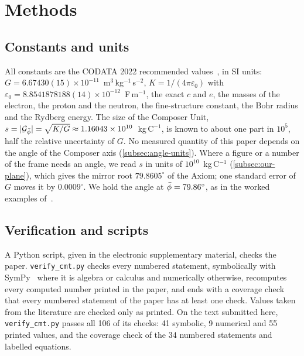 \section{Methods}\label{sec:methods}

\subsection{Constants and units}\label{subsec:constants}

All constants are the CODATA 2022 recommended values~\citep{CODATA2022}, in SI units: $G = 6.67430(15) \times 10^{-11}$~m$^3$\,kg$^{-1}$\,s$^{-2}$, $K = 1/(4\pi\varepsilon_0)$ with $\varepsilon_0 = 8.8541878188(14) \times 10^{-12}$~F\,m$^{-1}$, the exact $c$ and $e$, the masses of the electron, the proton and the neutron, the fine-structure constant, the Bohr radius and the Rydberg energy. The size of the Composer Unit, $s = \lvert\mathcal{G}_{\bar{\phi}}\rvert = \sqrt{K/G} \approx 1.16043 \times 10^{10}$~kg\,C$^{-1}$, is known to about one part in $10^5$, half the relative uncertainty of $G$. No measured quantity of this paper depends on the angle of the Composer axis (\cref{subsec:angle-units}). Where a figure or a number of the frame needs an angle, we read $s$ in units of $10^{10}$~kg\,C$^{-1}$ (\cref{subsec:our-plane}), which gives the mirror root $79.8605^\circ$ of the Axiom; one standard error of $G$ moves it by $0.0009^\circ$. We hold the angle at $\bar{\phi} = 79.86^\circ$, as in the worked examples of~\citep{DerrazGN2026}.

\subsection{Verification and scripts}\label{subsec:scripts}

A Python script, given in the electronic supplementary material, checks the paper. \texttt{verify\_cmt.py} checks every numbered statement, symbolically with SymPy~\citep{Meurer2017} where it is algebra or calculus and numerically otherwise, recomputes every computed number printed in the paper, and ends with a coverage check that every numbered statement of the paper has at least one check. Values taken from the literature are checked only as printed. On the text submitted here, \texttt{verify\_cmt.py} passes all 106 of its checks: 41 symbolic, 9 numerical and 55 printed values, and the coverage check of the 34 numbered statements and labelled equations.
